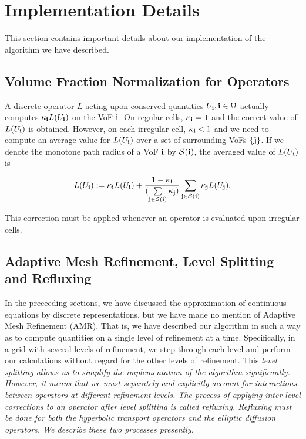 \section{Implementation Details\label{sec:Implementation}}

This section contains important details about our implementation of the 
algorithm we have described.

\subsection{Volume Fraction Normalization for Operators}

A discrete operator $L$ acting upon conserved quantities $U_{\bf i}, {\bf i} \in \Omega$ 
actually computes $\kappa_{\bf i} L(U_{\bf i})$ on the VoF ${\bf i}$. On regular 
cells, $\kappa_{\bf i} = 1$ and the correct value of $L(U_{\bf i})$ is obtained. 
However, on each irregular cell, $\kappa_{\bf i} < 1$ and we need to compute an 
average value for $L(U_{\bf i})$ over a set of surrounding VoFs $\{{\bf j}\}$. If we 
denote the monotone path radius of a VoF ${\bf i}$ by $\mathcal{S}({\bf i})$, the 
averaged value of $L(U_{\bf i})$ is 

\begin{equation}
L(U_{\bf i}) := \kappa_{\bf i} L(U_{\bf i}) + \frac{1-\kappa_{\bf i}}
{(\sum\limits_{{\bf j} \in \mathcal{S}({\bf i})} \kappa_{\bf j})} 
\sum\limits_{{\bf j} \in \mathcal{S}({\bf i})} \kappa_{\bf j} L(U_{\bf j}).
\end{equation}

\noindent 
This correction must be applied whenever an operator is evaluated upon 
irregular cells.

\subsection{Adaptive Mesh Refinement, Level Splitting and Refluxing}

In the preceeding sections, we have discussed the approximation of 
continuous equations by discrete representations, but we have made no mention
of Adaptive Mesh Refinement (AMR). That is, we have described our algorithm 
in such a way as to compute quantities on a single level of refinement at a 
time. Specifically, in a grid with several levels of refinement, we step through 
each level and perform our calculations without regard for the other levels of 
refinement. This \em level splitting \em allows us to simplify the 
implementation of the algorithm significantly. However, it means that we must 
separately and explicitly account for interactions between operators at 
different refinement levels. The process of applying inter-level corrections 
to an operator after level splitting is called \em refluxing\em.  Refluxing 
must be done for both the hyperbolic transport operators and the elliptic 
diffusion operators. We describe these two processes presently.

